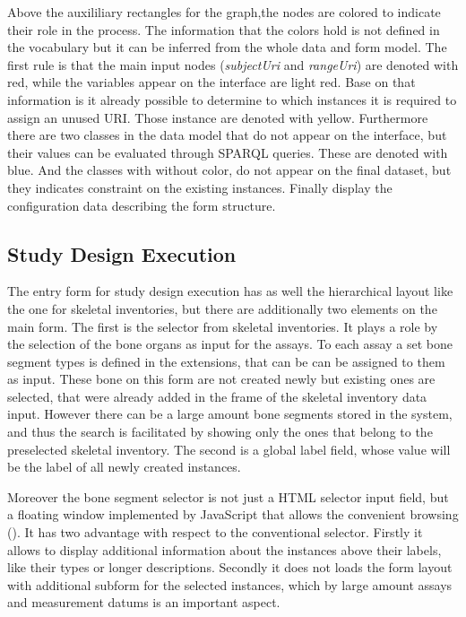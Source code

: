 

Above the auxililiary rectangles for the graph,the nodes are colored to indicate their role in the process. The information that the colors hold is not defined in the vocabulary but it can be inferred from the whole data and form model. The first rule is that the main input nodes (\textit{subjectUri} and \textit{rangeUri}) are denoted with red, while the variables appear on the interface are light red. Base on that information is it already possible to determine to which instances it is required to assign an unused URI. Those instance are denoted with yellow.
Furthermore there are two classes in the data model that do not appear on the interface, but their values can be evaluated through SPARQL queries. These are denoted with blue. And the classes with without color, do not appear on the final dataset, but they indicates constraint on the existing instances.
Finally  display the configuration data describing the form structure. 


\subsection{Study Design Execution} \label{43}


The entry form for study design execution has as well the hierarchical layout like the one for skeletal inventories, but there are additionally two elements on the main form. The first is the selector from skeletal inventories. It plays a role by the selection of the bone organs as input for the assays. To each assay a set bone segment types is defined in the extensions, that can be can be assigned to them as input. These bone on this form are not created newly but existing ones are selected, that were already added in the frame of the skeletal inventory data input.  However there can be a large amount bone segments stored in the system, and thus the search is facilitated by showing only the ones that belong to the preselected skeletal inventory. The second is a global label field, whose value will be the label of all newly created instances.





Moreover the bone segment selector is not just a HTML selector input field, but a floating window implemented by JavaScript that allows the convenient browsing (). It has two advantage with respect to the conventional selector. Firstly it allows to display additional information about the instances above their labels, like their types or longer descriptions. Secondly it does not loads the form layout with additional subform for the selected instances, which by large amount assays and measurement datums is an important aspect.

